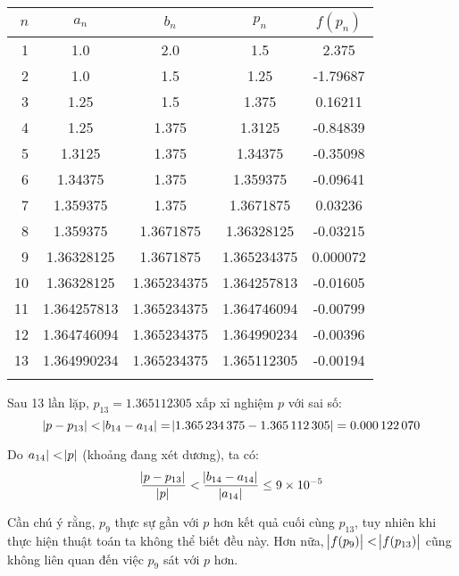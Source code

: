 \documentclass[../../Lectures.tex]{subfiles}
\begin{document}
\begin{exmp}
    \begin{tabular}{ r S[table-format=1.9] S[table-format=1.9] S[table-format=1.9] S[table-format=-2.6] }    %
        \\
        \toprule
         {\(n\)} &   {\(a_n\)}   &   {\(b_n\)}   &   {\(p_n\)}   & {\(f(p_n)\)} \\
          &  1.0          &  2.0          &  1.5          &   2.375      \\
              2  &  1.0          &  1.5          &  1.25         &  -1.79687    \\
              3  &  1.25         &  1.5          &  1.375        &   0.16211    \\
              4  &  1.25         &  1.375        &  1.3125       &  -0.84839    \\
              5  &  1.3125       &  1.375        &  1.34375      &  -0.35098    \\
              6  &  1.34375      &  1.375        &  1.359375     &  -0.09641    \\
              7  &  1.359375     &  1.375        &  1.3671875    &   0.03236    \\
              8  &  1.359375     &  1.3671875    &  1.36328125   &  -0.03215    \\
              9  &  1.36328125   &  1.3671875    &  1.365234375  &   0.000072   \\
             10  &  1.36328125   &  1.365234375  &  1.364257813  &  -0.01605    \\
             11  &  1.364257813  &  1.365234375  &  1.364746094  &  -0.00799    \\
             12  &  1.364746094  &  1.365234375  &  1.364990234  &  -0.00396    \\
             13  &  1.364990234  &  1.365234375  &  1.365112305  &  -0.00194    \\
        \bottomrule                                                             \\    %
    \end{tabular}

    Sau 13 lần lặp, \(p_{13} = \num{1.365112305}\) xấp xỉ nghiệm \(p\) với sai số:
    \[\abs{p - p_{13}} < \abs{b_{14} - a_{14}} = \abs{\num{1.365234375} - \num{1.365112305}} = \num{0.000122070}\]

    Do \(\abs{a_{14}} < \abs{p}\) (khoảng đang xét dương), ta có:
    \[\frac{\abs{p - p_{13}}}{\abs{p}} < \frac{\abs{b_{14} - a_{14}}}{\abs{a_{14}}} \leq \num{9e-5}\]

    Cần chú ý rằng, \(p_9\) thực sự gần với \(p\) hơn kết quả cuối cùng
    \(p_{13}\), tuy nhiên khi thực hiện thuật toán ta không thể biết đều này.
    Hơn nữa, \(\abs{f(p_9)} < \abs{f(p_{13})}\) cũng không liên quan đến việc
    \(p_9\) sát với \(p\) hơn.
\end{exmp}
\end{document}
